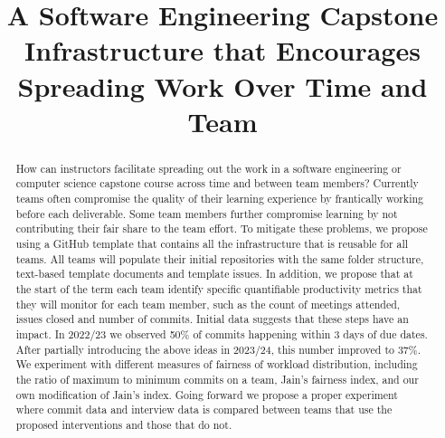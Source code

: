 \documentclass[10pt, conference]{IEEEtran}
\begin{document}
\title{A Software Engineering Capstone Infrastructure that Encourages Spreading
Work Over Time and Team}

\author{
}

\maketitle
  
\begin{abstract}

How can instructors facilitate spreading out the work in a software engineering
or computer science capstone course across time and between team members?
Currently teams often compromise the quality of their learning experience by
frantically working before each deliverable.  Some team members further
compromise learning by not contributing their fair share to the team effort. To
mitigate these problems, we propose using a GitHub template that contains all
the infrastructure that is reusable for all teams.  All teams will populate
their initial repositories with the same folder structure, text-based template
documents and template issues. In addition, we propose that at the start of the
term each team identify specific quantifiable productivity metrics that they
will monitor for each team member, such as the count of meetings attended,
issues closed and number of commits.  Initial data suggests that these steps
have an impact.  In 2022/23 we observed 50\% of commits happening within 3 days
of due dates.  After partially introducing the above ideas in 2023/24, this
number improved to 37\%. We experiment with different measures of fairness of
workload distribution, including the ratio of maximum to minimum commits on a
team, Jain's fairness index, and our own modification of Jain's index. Going
forward we propose a proper experiment where commit data and interview data is
compared between teams that use the proposed interventions and those that do
not.

\end{abstract}
\end{document}
